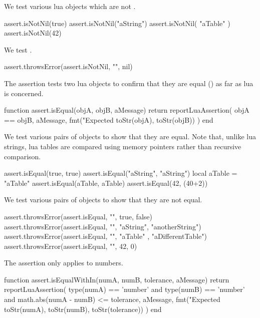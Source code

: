 
We test various lua objects which are not .

\startLuaTest
  assert.isNotNil(true)
  assert.isNotNil("aString")
  assert.isNotNil({ "aTable" })
  assert.isNotNil(42)
\stopLuaTest
\stopTestCase


We test .

\startLuaTest
  assert.throwsError(assert.isNotNil, "", nil)
\stopLuaTest
\stopTestSuite


The  assertion tests two lua objects to confirm that 
they are equal (\type{==}) as far as lua is concerned. 

\startLuaCode
function assert.isEqual(objA, objB, aMessage)
  return reportLuaAssertion(
    objA == objB,
    aMessage,
    fmt("Expected %
      toStr(objA), toStr(objB))
  )
end
\stopLuaCode


We test various pairs of objects to show that they are equal. Note that, 
unlike lua strings, lua tables are compared using memory pointers rather 
than recursive comparison. 

\startLuaTest
  assert.isEqual(true, true)
  assert.isEqual("aString", "aString")
  local aTable = { "aTable" }
  assert.isEqual(aTable, aTable)
  assert.isEqual(42, (40+2))
\stopLuaTest
\stopTestCase


We test various pairs of objects to show that they are not equal. 

\startLuaTest
  assert.throwsError(assert.isEqual, "", true, false)
  assert.throwsError(assert.isEqual, "",
    "aString", "anotherString")
  assert.throwsError(assert.isEqual, "",
    { "aTable" }, { "aDifferentTable"})
  assert.throwsError(assert.isEqual, "", 42, 0)
\stopLuaTest
\stopTestCase

\stopTestSuite


The  assertion only applies to numbers.

\startLuaCode
function assert.isEqualWithIn(numA, numB,
  tolerance, aMessage)
  return reportLuaAssertion(
    type(numA) == 'number' and type(numB) == 'number'
    and math.abs(numA - numB) <= tolerance,
    aMessage,
    fmt("Expected %
      toStr(numA), toStr(numB), toStr(tolerance))
  )
end
\stopLuaCode

